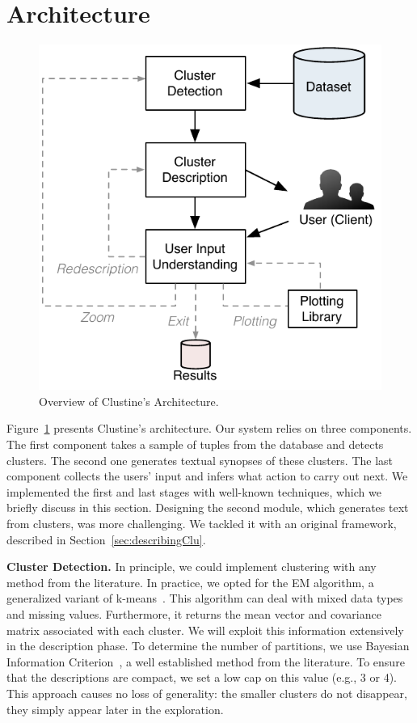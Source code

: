 \section{Architecture}
\label{sec:architecture}

\begin{figure}[t!]
  \centering
  \includegraphics[width=.7\columnwidth]{Architecture}
  \caption{Overview of Clustine's Architecture.}
  \label{fig:architecture}
\end{figure}

Figure~\ref{fig:architecture} presents Clustine's architecture.  Our system
relies on three components. The first component takes a sample of tuples from
the database and detects clusters. The second one generates textual synopses of
these clusters. The last component collects the users' input and infers what
action to carry out next. We implemented the first and last stages with
well-known techniques, which we briefly discuss in this section. Designing the
second module, which generates text from clusters, was more challenging. We
tackled it with an original framework, described in Section~\ref{sec:describingClu}.

\textbf{Cluster Detection.} In principle, we could implement clustering with
any method from the literature. In practice, we opted for the EM algorithm, a
generalized variant of k-means~\cite{bishop2001bishop}. This algorithm can deal
with mixed data types and missing values. Furthermore, it returns the mean
vector and covariance matrix associated with each cluster. We will exploit this
information extensively in the description phase. To determine the number of
partitions, we use Bayesian Information Criterion~\cite{bishop2001bishop}, a
well established method from the literature. To ensure that the descriptions
are compact, we set a low cap on this value (e.g., 3 or 4). This approach
causes no loss of generality: the smaller clusters do not disappear, they
simply appear later in the exploration.

